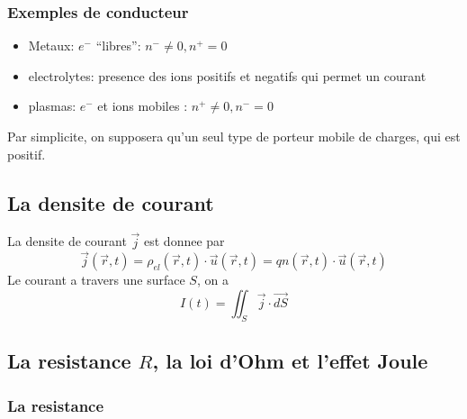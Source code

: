 \documentclass[../main.tex]{subfiles}
\begin{document}
\subsubsection*{Exemples de conducteur}

\begin{itemize}
\item Metaux: $e^{-}$ ``libres'': $n^{-}\neq 0, n^{+}=0$ 
\item electrolytes: presence des ions positifs et negatifs qui permet un courant
\item plasmas: $e^{-}$ et ions mobiles : $n^{+}\neq 0, n^{-}=0$
\end{itemize}
Par simplicite, on supposera qu'un seul type de porteur mobile de charges, qui est positif.\\
\subsection{ La densite de courant }
La densite de courant $\vec{j}$ est donnee par 
\[ 
	\vec{j}( \vec{r},t ) = \rho_{el} ( \vec{r},t)  \cdot \vec{u}( \vec{r},t) = q n ( \vec{r},t) \cdot \vec{u}( \vec{r},t) 
\]
Le courant a travers une surface $S$, on a 
\[ 
	I( t) = \iint_S \vec{j} \cdot \vec{dS}
\]
\subsection{La resistance $R$, la loi d'Ohm et l'effet Joule}
\subsubsection{La resistance}
\end{document}
